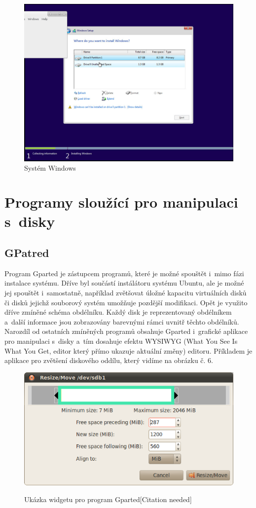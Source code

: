 \documentclass{report}
\begin{document}
\begin{figure}[h]
\label{fig:win}
\caption{Systém Windows}
\centering
\includegraphics[width=.8\columnwidth]{pics/win1.jpg}
\end{figure}

\section{Programy sloužící pro manipulaci s~disky}

\subsection{GPatred}

Program Gparted je zástupcem programů, které je možné spouštět i~mimo fázi instalace systému. Dříve byl součástí instálátoru systému Ubuntu, ale je možné jej spouštět i~samostatně, například 
 zvětšovat úložné kapacitu virtuálních disků či disků jejichž souborový systém umožňuje pozdější modifikaci. Opět je využito dříve zmíněné schéma obdélníku. Každý disk je reprezentovaný 
obdélníkem a~další informace jsou zobrazovány barevnými rámci uvnitř těchto obdélníků. Narozdíl od ostatních zmíněných programů obsahuje Gparted i~grafické aplikace pro manipulaci s~disky 
a~tím dosahuje efektu WYSIWYG (What You See Is What You Get, editor který přímo ukazuje aktuální změny) editoru. Příkladem je aplikace pro zvětšení diskového oddílu, který vidíme na obrázku č. 6.

\begin{figure}[hb]
\label{fig:gparted}
\caption{Ukázka widgetu pro program Gparted[Citation needed]}
\centering
\includegraphics[width=.8\columnwidth]{pics/gparted-5-big.png}\\
\end{figure}
\end{document}
